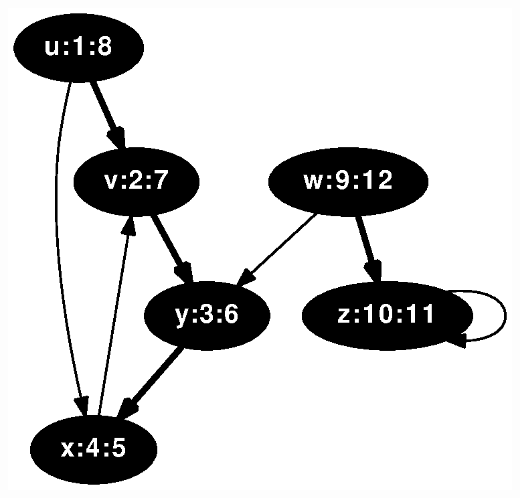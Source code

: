 \documentclass{article}
\begin{document}
\includegraphics[height=.3\textheight]{clrs_example_dfs_12.eps}
\end{document}
